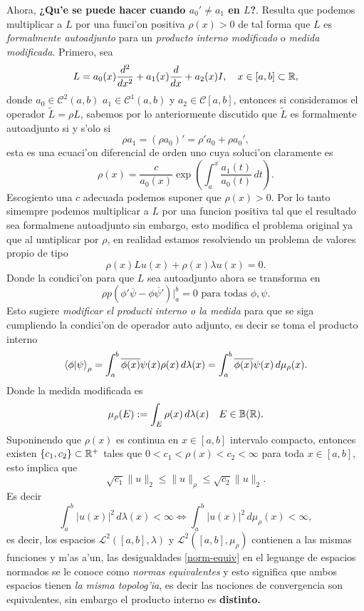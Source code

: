 \documentclass[main.tex]{subfiles}
\begin{document}
\noindent Ahora, \textbf{¿Qu'e se puede hacer cuando $a_{0}'\neq a_{1}$ en $L$?}. Resulta que podemos multiplicar a $L$ por una funci'on positiva $\rho(x)>0$ de tal forma que $L$ es \emph{formalmente autoadjunto} para un \emph{producto interno modificado} o \emph{medida modificada}. Primero, sea
\[
L=a_0(x)\frac{d^2}{dx^2}+a_1(x)\frac{d}{dx}+a_2(x)I,\quad x\in [a,b]\subset\mathbb R ,
\]
\noindent donde $a_{0}\in\mathcal{C}^{2}(a,b)$ $a_{1}\in\mathcal{C}^{1}(a,b)$ y $a_{2}\in\mathcal{C}[a,b]$, entonces si consideramos el operador $\tilde{L}=\rho L$, sabemos por lo anteriormente discutido que $\tilde{L}$ es formalmente autoadjunto si y s'olo si
\[
  \rho a_{1}=(\rho a_{0})'=\rho'a_{0}+\rho a_{0}',
\]
esta es una ecuaci'on diferencial de orden uno cuya soluci'on claramente es
\[
  \rho(x)=\frac{c}{a_{0}(x)}\exp\left(\int_{a}^{x}\frac{a_{1}(t)}{a_{0}(t)}\,dt\right).
\]
Escogiento una $c$ adecuada podemos suponer que $\rho(x)>0$. Por lo tanto simempre podemos multiplicar a $L$ por una funcion positiva tal que el resultado sea formalmene autoadjunto sin embargo, esto modifica el problema original ya que al umtiplicar por $\rho$, en realidad estamos resolviendo un problema de valores propio de tipo
\[
  \rho(x)Lu(x)+\rho(x)\lambda u(x)=0.
\]
\noindent Donde la condici'on para que $L$ sea autoadjunto ahora se transforma en
\[
  \rho p(\phi'\overline{\psi}-\phi\overline{\psi'})|_{a}^{b}=0\text{ para todas }\phi,\psi.
\]
Esto sugiere \emph{modificar el producti interno o  la medida} para que se siga cumpliendo la condici'on de operador auto adjunto, es decir se toma el producto interno
\begin{equation} \braket{\phi|\psi}_{\rho}=\int_{a}^{b}\overline{\phi(x)}\psi(x)\rho(x)\,d\lambda(x)=\int_{a}^{b}\overline{\phi(x)}\psi(x)\,d\mu_{\rho}(x).
\end{equation}
\noindent Donde la medida modificada es
\[
  \mu_{\rho}(E):=\int_{E}\rho(x)\,d\lambda(x)\quad E\in\mathbb{B}(\mathbb R ).
\]
\obs Suponinendo que $\rho(x)$ es continua en $x\in[a,b]$ intervalo compacto, entonces existen $\{c_{1},c_{2}\}\subset\mathbb R ^{+}$ tales que $0<c_{1}<\rho(x)<c_{2}<\infty$ para toda $x\in[a,b]$, esto implica que
\begin{equation}\label{norm-equiv}
  \sqrt{c_{1}}\|u\|_{2}\leq\|u\|_{\rho}\leq\sqrt{c_{2}}\|u\|_{2}.
\end{equation}
Es decir
\[
  \int_{a}^{b}|u(x)|^{2}\,d\lambda(x)<\infty\iff \int_{a}^{b}|u(x)|^{2}\,d\mu_{\rho}(x)<\infty,
\]
es decir, los espacios $\mathcal{L}^{2}([a,b],\lambda)$ y $\mathcal{L}^{2}([a,b],\mu_{\rho})$ contienen a las mismas funciones y m'as a'un, las desigualdades \ref{norm-equiv} en el leguange de espacios normados se le conoce como \emph{normas equivalentes} y esto significa que ambos espacios tienen \emph{la misma topolog'ia}, es decir las nociones de convergencia son equivalentes, sin embargo el producto interno es \textbf{distinto.}
\end{document}
